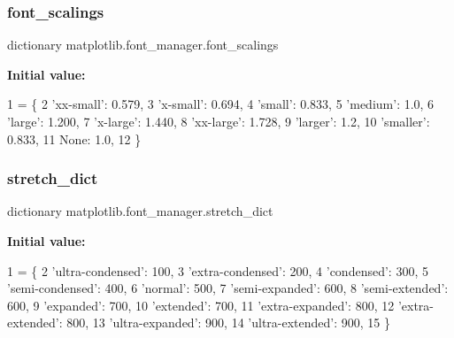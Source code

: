 \subsubsection{\texorpdfstring{font\+\_\+scalings}{font\_scalings}}
{\footnotesize\ttfamily dictionary matplotlib.\+font\+\_\+manager.\+font\+\_\+scalings}

{\bfseries Initial value\+:}
\begin{DoxyCode}
1 =  \{
2     \textcolor{stringliteral}{'xx-small'}: 0.579,
3     \textcolor{stringliteral}{'x-small'}:  0.694,
4     \textcolor{stringliteral}{'small'}:    0.833,
5     \textcolor{stringliteral}{'medium'}:   1.0,
6     \textcolor{stringliteral}{'large'}:    1.200,
7     \textcolor{stringliteral}{'x-large'}:  1.440,
8     \textcolor{stringliteral}{'xx-large'}: 1.728,
9     \textcolor{stringliteral}{'larger'}:   1.2,
10     \textcolor{stringliteral}{'smaller'}:  0.833,
11     \textcolor{keywordtype}{None}:       1.0,
12 \}
\end{DoxyCode}
\mbox{\label{namespacematplotlib_1_1font__manager_a095ada35e9a066bd1b88db8e550f4bbd}} 
\subsubsection{\texorpdfstring{stretch\+\_\+dict}{stretch\_dict}}
{\footnotesize\ttfamily dictionary matplotlib.\+font\+\_\+manager.\+stretch\+\_\+dict}

{\bfseries Initial value\+:}
\begin{DoxyCode}
1 =  \{
2     \textcolor{stringliteral}{'ultra-condensed'}: 100,
3     \textcolor{stringliteral}{'extra-condensed'}: 200,
4     \textcolor{stringliteral}{'condensed'}:       300,
5     \textcolor{stringliteral}{'semi-condensed'}:  400,
6     \textcolor{stringliteral}{'normal'}:          500,
7     \textcolor{stringliteral}{'semi-expanded'}:   600,
8     \textcolor{stringliteral}{'semi-extended'}:   600,
9     \textcolor{stringliteral}{'expanded'}:        700,
10     \textcolor{stringliteral}{'extended'}:        700,
11     \textcolor{stringliteral}{'extra-expanded'}:  800,
12     \textcolor{stringliteral}{'extra-extended'}:  800,
13     \textcolor{stringliteral}{'ultra-expanded'}:  900,
14     \textcolor{stringliteral}{'ultra-extended'}:  900,
15 \}
\end{DoxyCode}
\mbox{\label{namespacematplotlib_1_1font__manager_a8d9baa8500646980b236908b262aa8a1}} 

